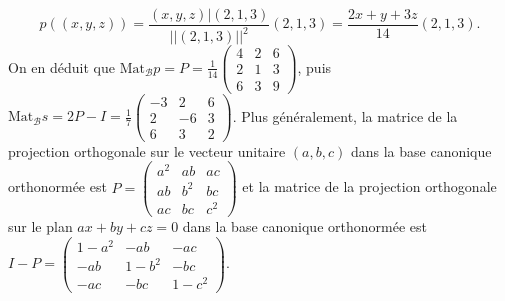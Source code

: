 \documentclass[11pt,a4paper]{article}
\begin{document}
$$p((x,y,z))=\frac{(x,y,z)|(2,1,3)}{||(2,1,3)||^2}(2,1,3)=\frac{2x+y+3z}{14}(2,1,3).$$ 
On en déduit que $\mbox{Mat}_{\mathcal{B}}p=P=\frac{1}{14}\left(
\begin{array}{ccc}
4&2&6\\
2&1&3\\
6&3&9
\end{array}
\right)$, puis $\mbox{Mat}_{\mathcal{B}}s=2P-I=\frac{1}{7}\left(
\begin{array}{ccc}
-3&2&6\\
2&-6&3\\
6&3&2
\end{array}
\right)$.
Plus généralement, la matrice de la projection orthogonale sur le vecteur unitaire $(a,b,c)$ dans la base canonique orthonormée est $P=\left(
\begin{array}{ccc}
a^2&ab&ac\\
ab&b^2&bc\\
ac&bc&c^2
\end{array}
\right)$ et la matrice de la projection orthogonale sur le plan $ax+by+cz=0$ dans la base canonique orthonormée est $I-P=
\left(
\begin{array}{ccc}
1-a^2&-ab&-ac\\
-ab&1-b^2&-bc\\
-ac&-bc&1-c^2
\end{array}
\right)$.
\end{document}

